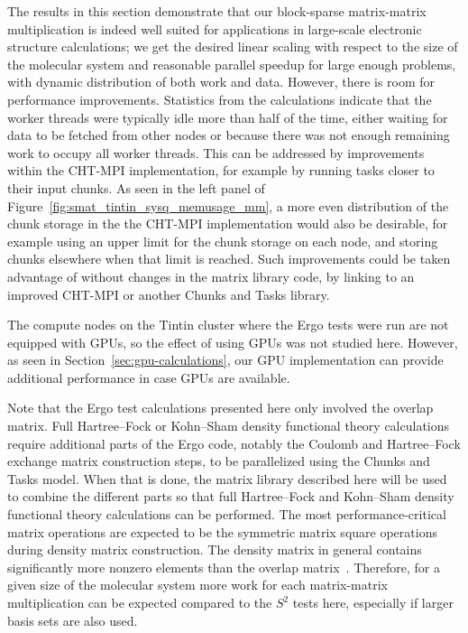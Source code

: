 \documentclass{elsarticle}
\begin{document}
The results in this section demonstrate that our block-sparse
matrix-matrix multiplication is indeed well suited for applications in
large-scale electronic structure calculations; we get the desired
linear scaling with respect to the size of the molecular system and
reasonable parallel speedup for large enough problems, with dynamic distribution of both work
and data. However, there is room for performance improvements.
Statistics from the calculations indicate that
the worker threads were typically idle more than half of the time, either
waiting for data to be fetched from other nodes or because there was
not enough remaining work to occupy all worker threads. This can be addressed
by improvements within the CHT-MPI implementation, for example by
running tasks closer to their input chunks.
As seen in the left panel of Figure~\ref{fig:smat_tintin_sysq_memusage_mm}, 
a more even distribution of the chunk storage in the the CHT-MPI
implementation would also be desirable, for example using an upper
limit for the chunk storage on each node, and storing chunks elsewhere
when that limit is reached.
Such improvements could be taken advantage of
without changes in the matrix library code, by linking to an
improved CHT-MPI or another Chunks and Tasks library.

The compute nodes on the Tintin cluster where the {\sc Ergo} tests
were run are not equipped with GPUs, so the effect of using GPUs was
not studied here. However, as seen in
Section~\ref{sec:gpu-calculations}, our GPU implementation can provide
additional performance in case GPUs are available. 

Note that the {\sc Ergo} test calculations presented here only involved the overlap
matrix. Full Hartree--Fock or Kohn--Sham density functional theory
calculations require additional parts of the {\sc Ergo} code, notably
the Coulomb and Hartree--Fock exchange matrix construction steps, to
be parallelized using the Chunks and Tasks model. When that is done,
the matrix library described here will be used to combine the
different parts so that full Hartree--Fock and Kohn--Sham density
functional theory calculations can be performed. The most
performance-critical matrix operations are expected to be the
symmetric matrix square operations during density matrix construction.
The density matrix in general contains significantly more nonzero
elements than the overlap matrix~\cite{sparsity-JCC:JCC21723}. Therefore, for a given size of the
molecular system more work for each matrix-matrix multiplication can be expected compared to the $S^2$ tests
here, especially if larger basis sets are also used.
\end{document}
